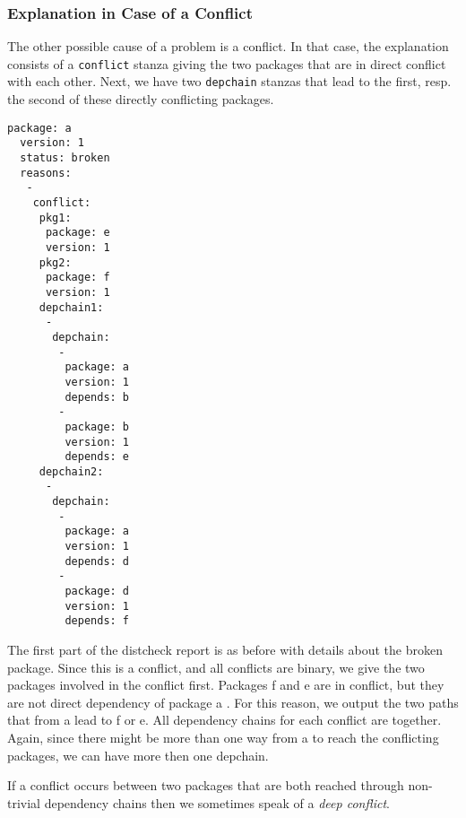 \subsubsection{Explanation in Case of a Conflict}
The other possible cause of a problem is a conflict. In that case, the
explanation consists of a \texttt{conflict} stanza giving the two
packages that are in direct conflict with each other. Next, we have
two \texttt{depchain} stanzas that lead to the first, resp. the second
of these directly conflicting packages.
\begin{example}
\begin{verbatim}
package: a
  version: 1
  status: broken
  reasons:
   -
    conflict:
     pkg1:
      package: e
      version: 1
     pkg2:
      package: f
      version: 1
     depchain1:
      -
       depchain:
        -
         package: a
         version: 1
         depends: b
        -
         package: b
         version: 1
         depends: e
     depchain2:
      -
       depchain:
        -
         package: a
         version: 1
         depends: d
        -
         package: d
         version: 1
         depends: f
\end{verbatim}
The first part of the distcheck report is as before with details about the
broken package. Since this is a conflict, and all conflicts are binary, we give
the two packages involved in the conflict first. Packages f and e are in
conflict, but they are not direct dependency of package a . For this reason, we
output the two paths that from a lead to f or e. All dependency chains for each
conflict are together. Again, since there might be more than one way from a to
reach the conflicting packages, we can have more then one depchain. 
\end{example}
If a conflict occurs between two packages that are both reached
through non-trivial dependency chains then we sometimes speak of a
\emph{deep conflict}.




